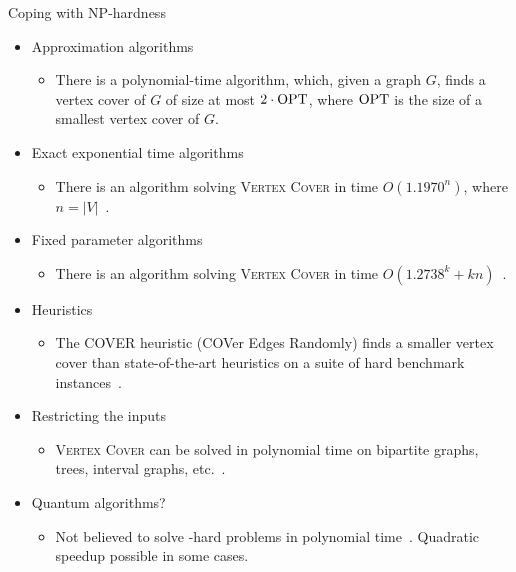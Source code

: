 \begin{frame}{Coping with NP-hardness}
 \begin{itemize}
  \item Approximation algorithms
  \begin{itemize}
	\item There is a polynomial-time algorithm, which, given a graph $G$, finds a vertex cover of $G$ of size at most $2\cdot \text{\normalfont OPT}$, where $\text{\normalfont OPT}$ is the size of a smallest vertex cover of $G$.
  \end{itemize}
  \item Exact exponential time algorithms
  \begin{itemize}
    \item There is an algorithm solving \textsc{Vertex Cover} in time $O(1.1970^n)$, where $n=|V|$~\cite{XiaoN17}.
  \end{itemize}
  \item Fixed parameter algorithms
  \begin{itemize}
    \item There is an algorithm solving \textsc{Vertex Cover} in time $O(1.2738^k+kn)$~\cite{ChenKX10}.
  \end{itemize}
  \item Heuristics
  \begin{itemize}
    \item The COVER heuristic (COVer Edges Randomly) finds a smaller vertex cover than state-of-the-art heuristics on a suite of hard benchmark instances~\cite{RichterHG07}.
  \end{itemize}
  \item Restricting the inputs
  \begin{itemize}
    \item \textsc{Vertex Cover} can be solved in polynomial time on bipartite graphs, trees, interval graphs, etc.~\cite{Golumbic04}.
  \end{itemize}
  \item Quantum algorithms?
  \begin{itemize}
   \item Not believed to solve \NP-hard problems in polynomial time~\cite{Aaronson05}. Quadratic speedup possible in some cases.
  \end{itemize}
 \end{itemize}
\end{frame}

